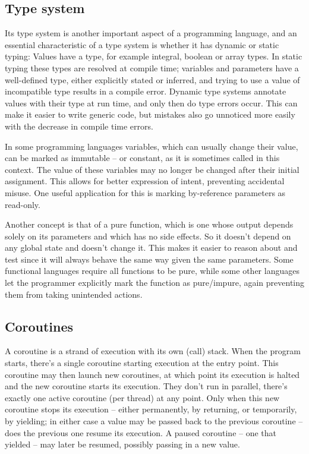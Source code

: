 		\subsection{Type system}
		Its type system is another important aspect of a programming language, and an essential characteristic of a type system is whether it has dynamic or static typing: Values have a type, for example integral, boolean or array types. In static typing these types are resolved at compile time; variables and parameters have a well-defined type, either explicitly stated or inferred, and trying to use a value of incompatible type results in a compile error.
		Dynamic type systems annotate values with their type at run time, and only then do type errors occur. This can make it easier to write generic code, but mistakes also go unnoticed more easily with the decrease in compile time errors.
		
		In some programming languages variables, which can usually change their value, can be marked as immutable -- or constant, as it is sometimes called in this context. The value of these variables may no longer be changed after their initial assignment. This allows for better expression of intent, preventing accidental misuse. One useful application for this is marking by-reference parameters as read-only.
		
		Another concept is that of a pure function, which is one whose output depends solely on its parameters and which has no side effects. So it doesn't depend on any global state and doesn't change it. This makes it easier to reason about and test since it will always behave the same way given the same parameters. Some functional languages require all functions to be pure, while some other languages let the programmer explicitly mark the function as pure/impure, again preventing them from taking unintended actions.
		
		\subsection{Coroutines}
		
		A coroutine is a strand of execution with its own (call) stack. When the program starts, there's a single coroutine starting execution at the entry point. This coroutine may then launch new coroutines, at which point its execution is halted and the new coroutine starts its execution. They don't run in parallel, there's exactly one active coroutine (per thread) at any point. Only when this new coroutine stops its execution -- either permanently, by returning, or temporarily, by yielding; in either case a value may be passed back to the previous coroutine -- does the previous one resume its execution. A paused coroutine -- one that yielded -- may later be resumed, possibly passing in a new value.
		
